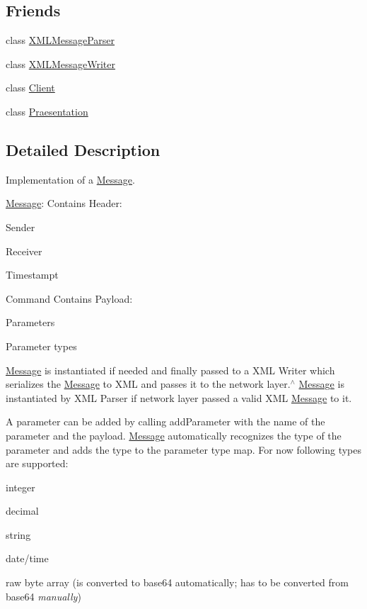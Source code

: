 \subsection*{Friends}
\begin{DoxyCompactItemize}
\item 
class \hyperlink{class_message_a3b49efc1a5ed45b65e8fbbf7a7e7a2fa}{X\+M\+L\+Message\+Parser}
\item 
class \hyperlink{class_message_a28ce36e58a67a190edd25dfaf58ec797}{X\+M\+L\+Message\+Writer}
\item 
class \hyperlink{class_message_a5db1c99e2c94b26278f3838c85cdb618}{Client}
\item 
class \hyperlink{class_message_a79767d474a726203aa273a6d4d99e1aa}{Praesentation}
\end{DoxyCompactItemize}


\subsection{Detailed Description}
Implementation of a \hyperlink{class_message}{Message}. 

\hyperlink{class_message}{Message}\+: Contains Header\+:
\begin{DoxyItemize}
\item Sender
\item Receiver
\item Timestampt
\item Command Contains Payload\+:
\item Parameters
\item Parameter types
\end{DoxyItemize}

\hyperlink{class_message}{Message} is instantiated if needed and finally passed to a X\+M\+L Writer which serializes the \hyperlink{class_message}{Message} to X\+M\+L and passes it to the network layer.$^\wedge$ \hyperlink{class_message}{Message} is instantiated by X\+M\+L Parser if network layer passed a valid X\+M\+L \hyperlink{class_message}{Message} to it.

A parameter can be added by calling add\+Parameter with the name of the parameter and the payload. \hyperlink{class_message}{Message} automatically recognizes the type of the parameter and adds the type to the parameter type map. For now following types are supported\+:
\begin{DoxyItemize}
\item integer
\item decimal
\item string
\item date/time
\item raw byte array (is converted to base64 automatically; has to be converted from base64 {\itshape manually})
\end{DoxyItemize}

